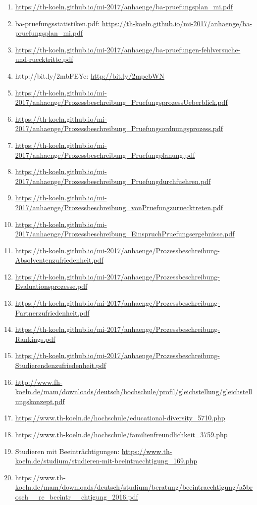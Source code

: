 \documentclass[BCOR12mm,DIV11,titlepage,a4paper,oneside,10pt]{scrbook}
\begin{document}
\begin{sloppypar}
\begin{flushleft}
\begin{enumerate}
\item{\url{https://th-koeln.github.io/mi-2017/anhaenge/ba-pruefungsplan\_mi.pdf}} 
\item{ba-pruefungsstatistiken.pdf: \url{https://th-koeln.github.io/mi-2017/anhaenge/ba-pruefungsplan\_mi.pdf} } 
\item{\url{https://th-koeln.github.io/mi-2017/anhaenge/ba-pruefungen-fehlversuche-und-ruecktritte.pdf}} 
\item{http://bit.ly/2mbFEYc: \url{http://bit.ly/2mpcbWN} } 
\item{\url{https://th-koeln.github.io/mi-2017/anhaenge/Prozessbeschreibung\_PruefungsprozessUeberblick.pdf}} 
\item{\url{https://th-koeln.github.io/mi-2017/anhaenge/Prozessbeschreibung\_Pruefungsordnungsprozess.pdf}} 
\item{\url{https://th-koeln.github.io/mi-2017/anhaenge/Prozessbeschreibung\_Pruefungplanung.pdf}} 
\item{\url{https://th-koeln.github.io/mi-2017/anhaenge/Prozessbeschreibung\_Pruefungdurchfuehren.pdf}} 
\item{\url{https://th-koeln.github.io/mi-2017/anhaenge/Prozessbeschreibung\_vonPruefungzuruecktreten.pdf}} 
\item{\url{https://th-koeln.github.io/mi-2017/anhaenge/Prozessbeschreibung\_EinspruchPruefungsergebnisse.pdf}} 
\item{\url{https://th-koeln.github.io/mi-2017/anhaenge/Prozessbeschreibung-Absolventenzufriedenheit.pdf}} 
\item{\url{https://th-koeln.github.io/mi-2017/anhaenge/Prozessbeschreibung-Evaluationsprozesse.pdf}} 
\item{\url{https://th-koeln.github.io/mi-2017/anhaenge/Prozessbeschreibung-Partnerzufriedenheit.pdf}} 
\item{\url{https://th-koeln.github.io/mi-2017/anhaenge/Prozessbeschreibung-Rankings.pdf}} 
\item{\url{https://th-koeln.github.io/mi-2017/anhaenge/Prozessbeschreibung-Studierendenzufriedenheit.pdf}} 
\item{\url{http://www.fh-koeln.de/mam/downloads/deutsch/hochschule/profil/gleichstellung/gleichstellungskonzept.pdf}} 
\item{\url{https://www.th-koeln.de/hochschule/educational-diversity\_5710.php}} 
\item{\url{https://www.th-koeln.de/hochschule/familienfreundlichkeit\_3759.php}} 
\item{Studieren mit Beeinträchtigungen: \url{https://www.th-koeln.de/studium/studieren-mit-beeintraechtigung\_169.php} } 
\item{\url{https://www.th-koeln.de/mam/downloads/deutsch/studium/beratung/beeintraechtigung/a5brosch\_\_re\_beeintr\_\_chtigung\_2016.pdf}} 

\end{enumerate}

\end{flushleft}
\end{sloppypar}

\backmatter
\end{document}
